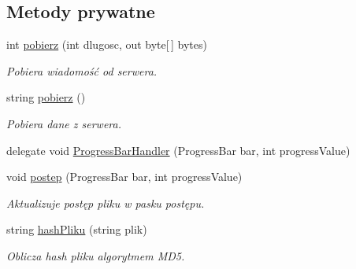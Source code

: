 \subsection*{Metody prywatne}
\begin{CompactItemize}
\item 
int \hyperlink{a00013_19e1f9dd822287532839c60661237142}{pobierz} (int dlugosc, out byte\mbox{[}$\,$\mbox{]} bytes)
\begin{CompactList}\small\item\em Pobiera wiadomość od serwera. \item\end{CompactList}\item 
string \hyperlink{a00013_1b3c9442d102dd6e6b4d64cb0c31b660}{pobierz} ()
\begin{CompactList}\small\item\em Pobiera dane z serwera. \item\end{CompactList}\item 
delegate void \hyperlink{a00013_5500d75da7421c54ebe1ab02e3386709}{ProgressBarHandler} (ProgressBar bar, int progressValue)
\item 
void \hyperlink{a00013_2ff0f54013633857e608e3020ed82f70}{postep} (ProgressBar bar, int progressValue)
\begin{CompactList}\small\item\em Aktualizuje postęp pliku w pasku postępu. \item\end{CompactList}\item 
string \hyperlink{a00013_d35eb35f48583fef5bf19cb2a0b2c9c5}{hashPliku} (string plik)
\begin{CompactList}\small\item\em Oblicza hash pliku algorytmem MD5. \item\end{CompactList}\end{CompactItemize}
